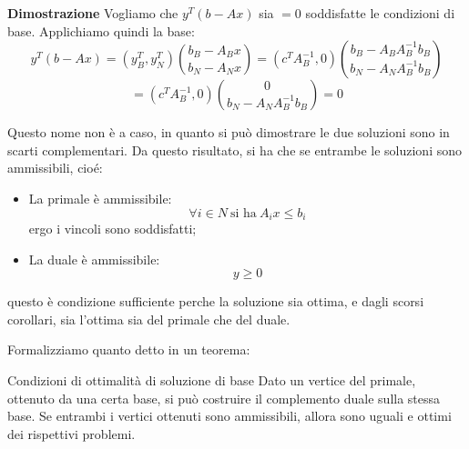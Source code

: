 \documentclass[a4paper,11pt]{article}
\begin{document}
\par\smallskip
\noindent 
\textbf{\textsf{Dimostrazione}}
Vogliamo che $y^T(b - Ax)$ sia $=0$ soddisfatte le condizioni di base.
Applichiamo quindi la base:
$$
y^T(b - Ax) = \left( y_B^T, y_N^T \right) \binom{b_B - A_B x}{b_N - A_N x} = \left( c^T A_B^{-1}, 0 \right) \binom{b_B - A_B A_B^{-1} b_B}{b_N - A_N A_B^{-1} b_B}
$$
$$
= \left( c^T A_B^{-1}, 0 \right) \binom{0}{b_N - A_N A_B^{-1} b_B} = 0
$$

Questo nome non è a caso, in quanto si può dimostrare le due soluzioni sono in scarti complementari.
Da questo risultato, si ha che se entrambe le soluzioni sono ammissibili, cioé:
\begin{itemize}
	\item La primale è ammissibile: 
		$$ \forall i \in N \ \text{si ha} \ A_i x \leq b_i $$
		ergo i vincoli sono soddisfatti;
	\item La duale è ammissibile:
		$$ y \geq 0$$
\end{itemize}
questo è condizione sufficiente perche la soluzione sia ottima, e dagli scorsi corollari, sia l'ottima sia del primale che del duale.

Formalizziamo quanto detto in un teorema:
\begin{theorem}{Condizioni di ottimalità di soluzione di base}
	Dato un vertice del primale, ottenuto da una certa base, si può costruire il complemento duale sulla stessa base.
	Se entrambi i vertici ottenuti sono ammissibili, allora sono uguali e ottimi dei rispettivi problemi.
\end{theorem}
\end{document}
